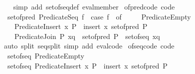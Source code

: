\begin{isabellebody}
%
\isadelimproof
\ \ %
\endisadelimproof
%
\isatagproof
{}\isamarkupfalse%
\ {\isacharparenleft}{\kern0pt}simp\ add{\isacharcolon}{\kern0pt}\ set{\isacharunderscore}{\kern0pt}of{\isacharunderscore}{\kern0pt}seq{\isacharunderscore}{\kern0pt}def\ eval{\isacharunderscore}{\kern0pt}member{\isacharparenright}{\kern0pt}%
\endisatagproof
{\isafoldproof}%
%
\isadelimproof
\isanewline
%
\endisadelimproof
\isanewline
{}\isamarkupfalse%
\ of{\isacharunderscore}{\kern0pt}pred{\isacharunderscore}{\kern0pt}code\ {\isacharbrackleft}{\kern0pt}code{\isacharbrackright}{\kern0pt}{\isacharcolon}{\kern0pt}\isanewline
\ \ {\isachardoublequoteopen}set{\isacharunderscore}{\kern0pt}of{\isacharunderscore}{\kern0pt}pred\ {\isacharparenleft}{\kern0pt}Predicate{\isachardot}{\kern0pt}Seq\ f{\isacharparenright}{\kern0pt}\ {\isacharequal}{\kern0pt}\ {\isacharparenleft}{\kern0pt}case\ f\ {\isacharparenleft}{\kern0pt}{\isacharparenright}{\kern0pt}\ of\isanewline
\ \ \ \ \ Predicate{\isachardot}{\kern0pt}Empty\ {\isasymRightarrow}\ {\isacharbraceleft}{\kern0pt}{\isacharbraceright}{\kern0pt}\isanewline
\ \ \ {\isacharbar}{\kern0pt}\ Predicate{\isachardot}{\kern0pt}Insert\ x\ P\ {\isasymRightarrow}\ insert\ x\ {\isacharparenleft}{\kern0pt}set{\isacharunderscore}{\kern0pt}of{\isacharunderscore}{\kern0pt}pred\ P{\isacharparenright}{\kern0pt}\isanewline
\ \ \ {\isacharbar}{\kern0pt}\ Predicate{\isachardot}{\kern0pt}Join\ P\ xq\ {\isasymRightarrow}\ set{\isacharunderscore}{\kern0pt}of{\isacharunderscore}{\kern0pt}pred\ P\ {\isasymunion}\ set{\isacharunderscore}{\kern0pt}of{\isacharunderscore}{\kern0pt}seq\ xq{\isacharparenright}{\kern0pt}{\isachardoublequoteclose}\isanewline
%
\isadelimproof
\ \ %
\endisadelimproof
%
\isatagproof
{}\isamarkupfalse%
\ {\isacharparenleft}{\kern0pt}auto\ split{\isacharcolon}{\kern0pt}\ seq{\isachardot}{\kern0pt}split\ simp\ add{\isacharcolon}{\kern0pt}\ eval{\isacharunderscore}{\kern0pt}code{\isacharparenright}{\kern0pt}%
\endisatagproof
{\isafoldproof}%
%
\isadelimproof
\isanewline
%
\endisadelimproof
\isanewline
{}\isamarkupfalse%
\ of{\isacharunderscore}{\kern0pt}seq{\isacharunderscore}{\kern0pt}code\ {\isacharbrackleft}{\kern0pt}code{\isacharbrackright}{\kern0pt}{\isacharcolon}{\kern0pt}\isanewline
\ \ {\isachardoublequoteopen}set{\isacharunderscore}{\kern0pt}of{\isacharunderscore}{\kern0pt}seq\ Predicate{\isachardot}{\kern0pt}Empty\ {\isacharequal}{\kern0pt}\ {\isacharbraceleft}{\kern0pt}{\isacharbraceright}{\kern0pt}{\isachardoublequoteclose}\isanewline
\ \ {\isachardoublequoteopen}set{\isacharunderscore}{\kern0pt}of{\isacharunderscore}{\kern0pt}seq\ {\isacharparenleft}{\kern0pt}Predicate{\isachardot}{\kern0pt}Insert\ x\ P{\isacharparenright}{\kern0pt}\ {\isacharequal}{\kern0pt}\ insert\ x\ {\isacharparenleft}{\kern0pt}set{\isacharunderscore}{\kern0pt}of{\isacharunderscore}{\kern0pt}pred\ P{\isacharparenright}{\kern0pt}{\isachardoublequoteclose}\isanewline

\end{isabellebody}
